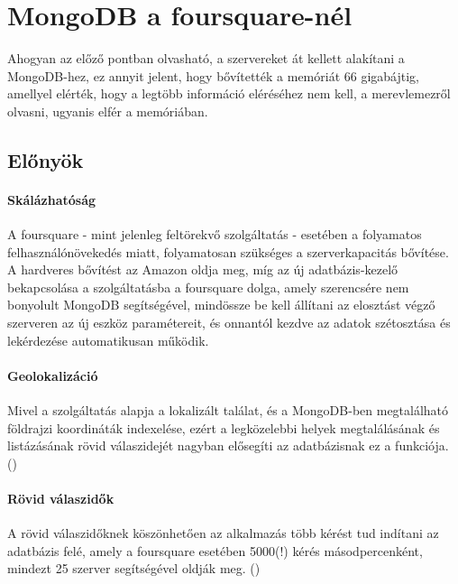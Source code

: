 
\section{MongoDB a foursquare-nél}

Ahogyan az előző pontban olvasható, a szervereket át kellett alakítani a MongoDB-hez, ez annyit jelent, hogy bővítették a memóriát 66 gigabájtig, amellyel elérték, hogy a legtöbb információ eléréséhez nem kell, a merevlemezről olvasni, ugyanis elfér a memóriában.


\subsection{Előnyök}

	\paragraph{Skálázhatóság}
		A foursquare - mint jelenleg feltörekvő szolgáltatás - esetében a folyamatos felhasználónövekedés miatt, folyamatosan szükséges a szerverkapacitás bővítése. A hardveres bővítést az Amazon oldja meg, míg az új adatbázis-kezelő bekapcsolása a szolgáltatásba a foursquare dolga, amely szerencsére nem bonyolult MongoDB segítségével, mindössze be kell állítani az elosztást végző szerveren az új eszköz paramétereit, és onnantól kezdve az adatok szétosztása és lekérdezése automatikusan működik.

	\paragraph{Geolokalizáció}
		Mivel a szolgáltatás alapja a lokalizált találat, és a MongoDB-ben megtalálható földrajzi koordináták indexelése, ezért a legközelebbi helyek megtalálásának és listázásának rövid válaszidejét nagyban elősegíti az adatbázisnak ez a funkciója. ()
 
 	\paragraph{Rövid válaszidők}
 	A rövid válaszidőknek köszönhetően az alkalmazás több kérést tud indítani az adatbázis felé, amely a foursquare esetében 5000(!) kérés másodpercenként, mindezt 25 szerver segítségével oldják meg. ()
